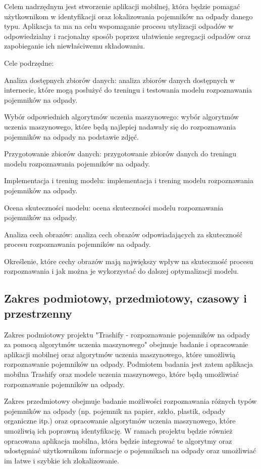 \documentclass[12pt,oneside]{book}
\begin{document}
Celem nadrzędnym jest stworzenie aplikacji mobilnej, która będzie pomagać użytkownikom w identyfikacji oraz lokalizowania pojemników na odpady danego typu. Aplikacja ta ma na celu wspomaganie procesu utylizacji odpadów w odpowiedzialny i racjonalny sposób poprzez ułatwienie segregacji odpadów oraz zapobieganie ich niewłaściwemu składowaniu.

Cele podrzędne:

    Analiza dostępnych zbiorów danych: analiza zbiorów danych dostępnych w internecie, które mogą posłużyć do treningu i testowania modelu rozpoznawania pojemników na odpady.

    Wybór odpowiednich algorytmów uczenia maszynowego: wybór algorytmów uczenia maszynowego, które będą najlepiej nadawały się do rozpoznawania pojemników na odpady na podstawie zdjęć.

    Przygotowanie zbiorów danych: przygotowanie zbiorów danych do treningu modelu rozpoznawania pojemników na odpady.

    Implementacja i trening modelu: implementacja i trening modelu rozpoznawania pojemników na odpady.

    Ocena skuteczności modelu: ocena skuteczności modelu rozpoznawania pojemników na odpady.

    Analiza cech obrazów: analiza cech obrazów odpowiadających za skuteczność procesu rozpoznawania pojemników na odpady.

    Określenie, które cechy obrazów mają największy wpływ na skuteczność procesu rozpoznawania i jak można je wykorzystać do dalszej optymalizacji modelu.

\subsection{Zakres podmiotowy, przedmiotowy, czasowy i przestrzenny}

Zakres podmiotowy projektu "Trashify - rozpoznawanie pojemników na odpady za pomocą algorytmów uczenia maszynowego" obejmuje badanie i opracowanie aplikacji mobilnej oraz algorytmów uczenia maszynowego, które umożliwią rozpoznawanie pojemników na odpady. Podmiotem badania jest zatem aplikacja mobilna Trashify oraz modele uczenia maszynowego, które będą umożliwiać rozpoznawanie pojemników na odpady.

Zakres przedmiotowy obejmuje badanie możliwości rozpoznawania różnych typów pojemników na odpady (np. pojemnik na papier, szkło, plastik, odpady organiczne itp.) oraz opracowanie algorytmów uczenia maszynowego, które umożliwią ich poprawną identyfikację. W ramach projektu będzie również opracowana aplikacja mobilna, która będzie integrować te algorytmy oraz udostępniać użytkownikom informacje o pojemnikach na odpady oraz umożliwiać im łatwe i szybkie ich zlokalizowanie.
\end{document}
